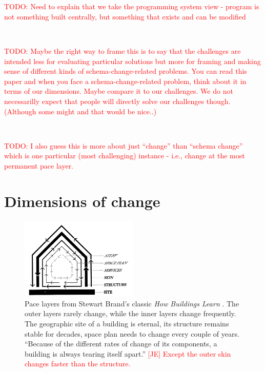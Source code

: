 \documentclass[english,submission]{programming}
\begin{document}
~

~

\textcolor{red}{TODO: Need to explain that we take the programming system view - program is not something
built centrally, but something that exists and can be modified}

~

\textcolor{red}{TODO: Maybe the right way to frame this is to say that the challenges are intended
less for evaluating particular solutions but more for framing and making sense of different
kinds of schema-change-related problems.  You can read this paper and when you face a schema-change-related
problem, think about it in terms of our dimensions. Maybe compare it to our challenges.
We do not necessarilly expect that people will directly solve our challenges though. (Although
some might and that would be nice..)}

~

\textcolor{red}{TODO: I also guess this is more about just ``change'' than ``schema change''
which is one particular (most challenging) instance - i.e., change at the most permanent
pace layer.}

\newpage
\section{Dimensions of change}

\begin{figure}[t]
\vspace{-1em}
\centering
\includegraphics[width=0.5\textwidth]{figures/layers.png}
\caption{Pace layers from Stewart Brand's classic \emph{How Buildings Learn} \cite{Brand95}.
  The outer layers rarely change, while the inner layers change frequently. The geographic
  site of a building is eternal, its structure remains stable for decades, space plan
  needs to change every couple of years. ``Because of the different rates of change of its
  components, a building is always tearing itself apart.''
  \textcolor{red}{[JE] Except the outer skin changes faster than the structure.}
  }
\label{fig:layers}
\end{figure}
\end{document}
